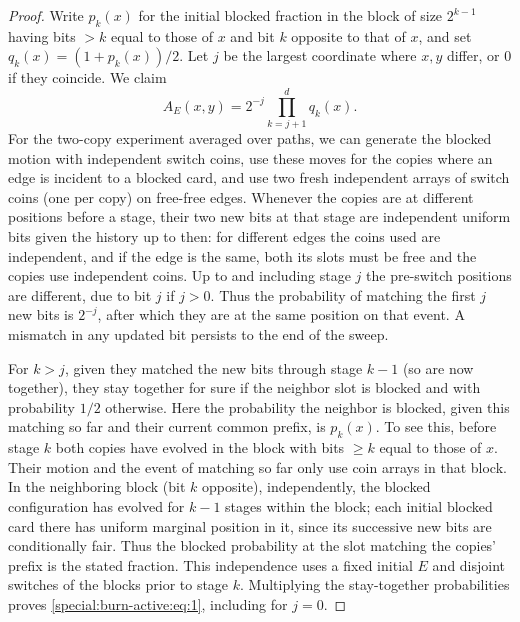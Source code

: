 \begin{proof}
Write \(p_k(x)\) for the initial blocked fraction in the block of size \(2^{k-1}\) having bits \(>k\) equal to those of \(x\) and bit \(k\) opposite to that of \(x\), and set \(q_k(x)=(1+p_k(x))/2\). Let \(j\) be the largest coordinate where \(x,y\) differ, or \(0\) if they coincide. We claim
\begin{equation}
 A_E(x,y)=2^{-j}\prod_{k=j+1}^d q_k(x). \label{special:burn-active:eq:1}
\end{equation}
For the two-copy experiment averaged over paths, we can generate the blocked motion with independent switch coins, use these moves for the copies where an edge is incident to a blocked card, and use two fresh independent arrays of switch coins (one per copy) on free-free edges. Whenever the copies are at different positions before a stage, their two new bits at that stage are independent uniform bits given the history up to then: for different edges the coins used are independent, and if the edge is the same, both its slots must be free and the copies use independent coins. Up to and including stage \(j\) the pre-switch positions are different, due to bit \(j\) if \(j>0\). Thus the probability of matching the first \(j\) new bits is \(2^{-j}\), after which they are at the same position on that event. A mismatch in any updated bit persists to the end of the sweep.

For \(k>j\), given they matched the new bits through stage \(k-1\) (so are now together), they stay together for sure if the neighbor slot is blocked and with probability \(1/2\) otherwise. Here the probability the neighbor is blocked, given this matching so far and their current common prefix, is \(p_k(x)\). To see this, before stage \(k\) both copies have evolved in the block with bits \(\ge k\) equal to those of \(x\). Their motion and the event of matching so far only use coin arrays in that block. In the neighboring block (bit \(k\) opposite), independently, the blocked configuration has evolved for \(k-1\) stages within the block; each initial blocked card there has uniform marginal position in it, since its successive new bits are conditionally fair. Thus the blocked probability at the slot matching the copies' prefix is the stated fraction. This independence uses a fixed initial \(E\) and disjoint switches of the blocks prior to stage \(k\). Multiplying the stay-together probabilities proves \eqref{special:burn-active:eq:1}, including for \(j=0\).


\end{proof}
